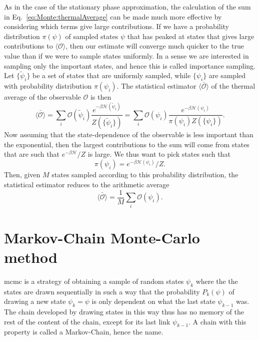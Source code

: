 As in the case of the stationary phase approximation, the calculation of the sum in Eq.~\eqref{eq:Monte:thermalAverage} can be made much more effective
by considering which terms give large contributions. If we have a probability distribution $\pi(\psi)$ of sampled states $\psi$ that has peaked at states
that gives large contributions to $\langle\mathcal{O}\rangle$, then our estimate will converge much quicker to the true value than if we were to
sample states uniformly. In a sense we are interested in sampling only the important states, and hence this is called importance sampling. Let
$\{\tilde{\psi}_i\}$ be a set of states that are uniformly sampled, while $\{\psi_i\}$ are sampled with probability distribution $\pi(\psi_i)$. The
statistical estimator $\bar{\langle\mathcal{O}\rangle}$ of the thermal average of the observable $\mathcal{O}$ is then
\begin{equation}
    \label{eq:Monte:importanceSampledThermAvg}
    \bar{\langle\mathcal{O}\rangle} = \sum_{i}\mathcal{O}(\tilde{\psi}_i)\frac{e^{-\beta\mathcal{H}(\tilde{\psi}_i)}}{Z(\{\tilde{\psi}_i\})} = \sum_{i}\mathcal{O}(\psi_i)\frac{e^{-\beta\mathcal{H}(\psi_i)}}{\pi(\psi_i)Z(\{\psi_i\})}.
\end{equation}
Now assuming that the state-dependence of the observable is less important than the exponential, then the largest contributions to the sum will
come from states that are such that $e^{-\beta\mathcal{H}}/Z$ is large. We thus want to pick states such that 
\begin{equation}
    \label{eq:Monte:boltzmannDist}
    \pi(\psi_i) = e^{-\beta\mathcal{H}(\psi_i)}/Z.
\end{equation}
Then, given $M$ states sampled according to this probability distribution, the statistical estimator reduces to the arithmetic average
\begin{equation}
    \label{eq:Monte:arithmTherm:Avg}
    \bar{\langle\mathcal{O}\rangle} = \frac{1}{M}\sum_i\mathcal{O}(\psi_i).
\end{equation}

\section{Markov-Chain Monte-Carlo method}

\ac{mcmc} is a strategy of obtaining a sample of random states $\psi_k$ where the the states are drawn sequentially in such
a way that the probability $P_k(\psi)$ of drawing a new state $\psi_k=\psi$ is only dependent on what the last
state $\psi_{k-1}$ was. The chain developed by drawing states in this way thus has no memory of the rest of the content
of the chain, except for its last link $\psi_{k-1}$. A chain with this property is called a Markov-Chain, hence the name.

